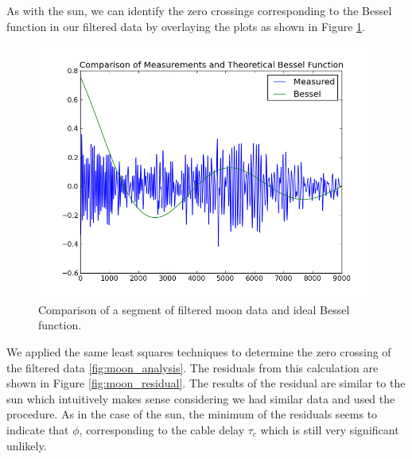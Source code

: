 \documentclass{article}
\begin{document}
    As with the sun, we can identify the zero crossings corresponding to the
    Bessel function in our filtered data by overlaying the plots as shown in
    Figure \ref{fig:compare_bessel_moon}.

    \begin{figure}[ht!]
    \centering
    \includegraphics[scale=0.5]{img/moon/compare_bessel.png}
    \caption{Comparison of a segment of filtered moon data and ideal Bessel function.}
    \label{fig:compare_bessel_moon}
    \end{figure}

    We applied the same least squares techniques to determine the zero crossing
    of the filtered data \ref{fig:moon_analysis}. The residuals from this
    calculation are shown in Figure \ref{fig:moon_residual}. The results of the
    residual are similar to the sun which intuitively makes sense considering we
    had similar data and used the procedure. As in the case of the sun, the
    minimum of the residuals seems to indicate that $\phi$, corresponding to the
    cable delay $\tau_c$ which is still very significant unlikely.
\end{document}
